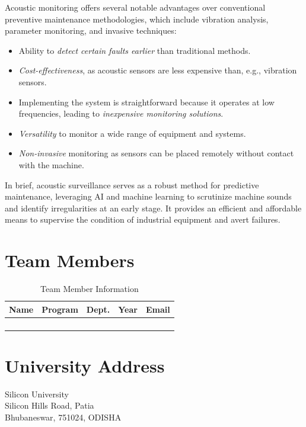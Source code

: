 \documentclass[12pt,twoside]{article}
\begin{document}
Acoustic monitoring offers several notable advantages over conventional preventive maintenance methodologies, which include vibration analysis, parameter monitoring, and invasive techniques:
\begin{itemize}
    \item Ability to \textit{detect certain faults earlier} than traditional methods.
    \item \textit{Cost-effectiveness}, as acoustic sensors are less expensive than, e.g., vibration sensors.
    \item Implementing the system is straightforward because it operates at low frequencies, leading to \textit{inexpensive monitoring solutions}.
    \item \textit{Versatility} to monitor a wide range of equipment and systems.
    \item \textit{Non-invasive} monitoring as sensors can be placed remotely without contact with the machine.
\end{itemize}

In brief, acoustic surveillance serves as a robust method for predictive maintenance, leveraging AI and machine learning to scrutinize machine sounds and identify irregularities at an early stage. It provides an efficient and affordable means to supervise the condition of industrial equipment and avert failures.


\section{Team Members}
\begin{table}[h]
    \centering
    \begin{tabular}{|c|c|c|c|c|}
        \hline
        \textbf{Name} & \textbf{Program} & \textbf{Dept.} & \textbf{Year} & \textbf{Email} \\ \hline\hline
        & & & & \\ \hline
        & & & & \\ \hline
        & & & & \\ \hline
        & & & & \\ \hline
    \end{tabular}
    \caption{Team Member Information}
    \label{tab:student_info}
\end{table}

\section{University Address}
Silicon University \\
Silicon Hills Road, Patia \\
Bhubaneswar, 751024, ODISHA
\end{document}
